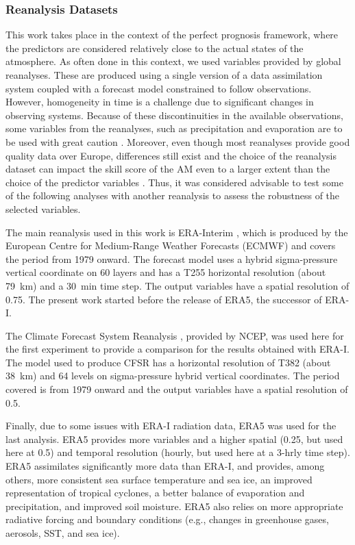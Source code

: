 \documentclass[draft]{agujournal2019}
\begin{document}
\subsubsection{Reanalysis Datasets}
\label{reanalyses}

This work takes place in the context of the perfect prognosis framework, where the predictors are considered relatively close to the actual states of the atmosphere. As often done in this context, we used variables provided by global reanalyses. These are produced using a single version of a data assimilation system coupled with a forecast model constrained to follow observations. However, homogeneity in time is a challenge due to significant changes in observing systems. Because of these discontinuities in the available observations, some variables from the reanalyses, such as precipitation and evaporation are to be used with great caution \cite{Kobayashi2015}. Moreover, even though most reanalyses provide good quality data over Europe, differences still exist and the choice of the reanalysis dataset can impact the skill score of the AM even to a larger extent than the choice of the predictor variables \cite{Horton2018b}. Thus, it was considered advisable to test some of the following analyses with another reanalysis to assess the robustness of the selected variables.

The main reanalysis used in this work is ERA-Interim \cite<ERA-I,>{Dee2011a}, which is produced by the European Centre for Medium-Range Weather Forecasts (ECMWF) and covers the period from 1979 onward. The forecast model uses a hybrid sigma-pressure vertical coordinate on 60 layers and has a T255 horizontal resolution (about 79~km) and a 30~min time step. The output variables have a spatial resolution of 0.75\degree. The present work started before the release of ERA5, the successor of ERA-I.

The Climate Forecast System Reanalysis \cite<CFSR,>{Saha2010a}, provided by NCEP, was used here for the first experiment to provide a comparison for the results obtained with ERA-I. The model used to produce CFSR has a horizontal resolution of T382 (about 38~km) and 64 levels on sigma-pressure hybrid vertical coordinates. The period covered is from 1979 onward and the output variables have a spatial resolution of 0.5\degree.

Finally, due to some issues with ERA-I radiation data, ERA5 \cite{Hersbach2019} was used for the last analysis. ERA5 provides more variables and a higher spatial (0.25\degree, but used here at 0.5\degree) and temporal resolution (hourly, but used here at a 3-hrly time step). ERA5 assimilates significantly more data than ERA-I, and provides, among others, more consistent sea surface temperature and sea ice, an improved representation of tropical cyclones, a better balance of evaporation and precipitation, and improved soil moisture. ERA5 also relies on more appropriate radiative forcing and boundary conditions (e.g., changes in greenhouse gases, aerosols, SST, and sea ice).
\end{document}
